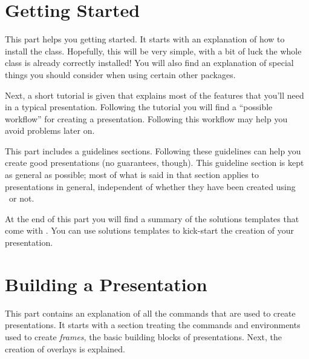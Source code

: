 \documentclass[doc2]{ltxdoc}
\begin{document}

\tableofcontents






\part{Getting Started}

This part helps you getting started. It starts with an explanation of how to install the class. Hopefully, this will be very simple, with a bit of luck the whole class is already correctly installed! You will also find an explanation of special things you should consider when using certain other packages.

Next, a short tutorial is given that explains most of the features that you'll need in a typical presentation. Following the tutorial you will find a ``possible workflow'' for creating a presentation. Following this workflow may help you avoid problems later on.

This part includes a guidelines sections. Following these guidelines can help you create good presentations (no guarantees, though). This guideline section is kept as general as possible; most of what is said in that section applies to presentations in general, independent of whether they have been created using \beamer\ or not.

At the end of this part you will find a summary of the solutions templates that come with \beamer. You can use solutions templates to kick-start the creation of your presentation.









\part{Building a Presentation}

This part contains an explanation of all the commands that are used to create presentations. It starts with a section treating the commands and environments used to create \emph{frames}, the basic building blocks of presentations. Next, the creation of overlays is explained.
\end{document}
